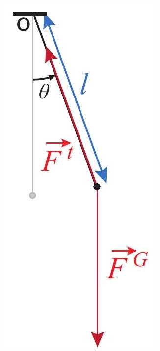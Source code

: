 \documentclass[10pt]{article}
\begin{document}
\begin{center}
\includegraphics[max width=\textwidth]{2024_09_14_9969b06773f10b6936e8g-281}
\end{center}
\end{document}
